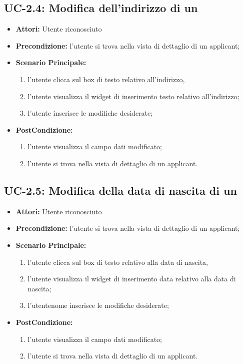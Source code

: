 \subsection{UC-2.4: Modifica dell'indirizzo di un \applicant}
\begin{itemize}
	\item \textbf{Attori:} Utente riconosciuto
	\item \textbf{Precondizione:}  l'utente si trova nella vista di dettaglio di un applicant;
	\item \textbf{Scenario Principale:}
	\begin{enumerate}
		\item l'utente clicca sul box di testo relativo all'indirizzo,
		\item l'utente visualizza il  widget di inserimento testo relativo all'indirizzo;
		\item l'utente inserisce le modifiche desiderate;
	\end{enumerate}
	\item \textbf{PostCondizione:} 
	\begin{enumerate}
		\item l'utente visualizza il campo dati modificato;
		\item l'utente si trova nella vista di dettaglio di un applicant.
	\end{enumerate}
	
\end{itemize}

\subsection{UC-2.5: Modifica della data di nascita di un \applicant}
\begin{itemize}
	\item \textbf{Attori:} Utente riconosciuto
	\item \textbf{Precondizione:}  l'utente si trova nella vista di dettaglio di un applicant;
	\item \textbf{Scenario Principale:}
	\begin{enumerate}
		\item l'utente clicca sul box di testo relativo alla data di nascita,
		\item l'utente visualizza il  widget di inserimento data relativo alla data di nascita;
		\item l'utentenome inserisce le modifiche desiderate;
	\end{enumerate}
	\item \textbf{PostCondizione:} 
	\begin{enumerate}
		\item l'utente visualizza il campo dati modificato;
		\item l'utente si trova nella vista di dettaglio di un applicant.
	\end{enumerate}
	
\end{itemize}


